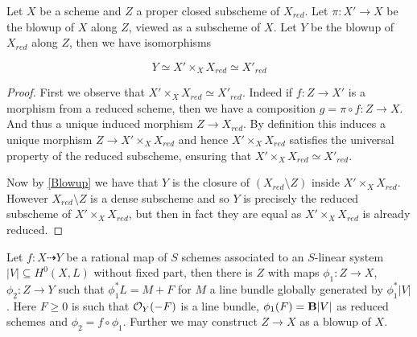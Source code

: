 \begin{lemma}\label{Blowup}
	
	Let $X$ be a scheme and $Z$ a proper closed subscheme of $X_{red}$. Let $\pi:X' \to X$ be the blowup of $X$ along $Z$, viewed as a subscheme of $X$. Let $Y$ be the blowup of $X_{red}$ along $Z$, then we have isomorphisms
	
	\[Y \simeq X'\times_{X} X_{red} \simeq X'_{red}\]
	
\end{lemma}
\begin{proof}
	
	First we observe that $X'\times_{X} X_{red} \simeq X'_{red}$. Indeed if $f:Z \to X'$ is a morphism from a reduced scheme, then we have a composition $g=\pi \circ f: Z \to X$. And thus a unique induced morphism $Z \to X_{red}$. By definition this induces a unique morphism $Z \to X'\times_{X} X_{red}$ and hence $X'\times_{X} X_{red}$ satisfies the universal property of the reduced subscheme, ensuring that $X'\times_{X} X_{red} \simeq X'_{red}$.
	
	Now by \autoref{Blowup} we have that $Y$ is the closure of $(X_{red}\setminus Z)$ inside $X'\times_{X} X_{red}$. However $X_{red}\setminus Z$ is a dense subscheme and so $Y$ is precisely the reduced subscheme of $X'\times_{X} X_{red}$, but then in fact they are equal as $X'\times_{X} X_{red}$ is already reduced.
	
	
\end{proof}

\begin{lemma}\label{elim}
	Let $f: X \dashrightarrow Y$ be a rational map of $S$ schemes associated to an $S$-linear system $|V|\subseteq H^{0}(X,L)$ without fixed part, then there is $Z$ with maps $\phi_{1}:Z \to X$, $\phi_{2}:Z \to Y$ such that $\phi_{1}^{*}L=M+F$ for $M$ a line bundle globally generated by $\phi_{1}^{*}|V|$. Here $F \geq 0$ is such that $\ox[Y](-F)$ is a line bundle, $\phi_{1}(F)=\BB|V|$ as reduced schemes and $\phi_{2}=f\circ \phi_{1}$. Further we may construct $Z \to X$ as a blowup of $X$.
\end{lemma}

